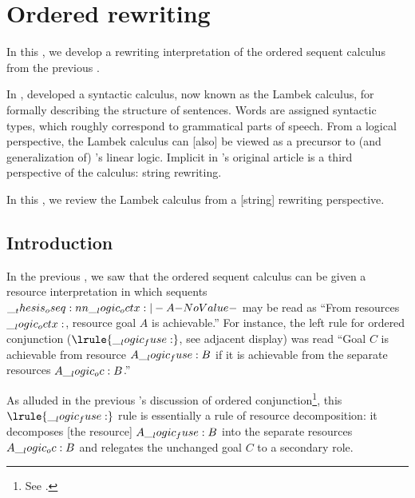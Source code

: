 \chapter{Ordered rewriting}\label{ch:ordered-rewriting}

In this , we develop a rewriting interpretation of the ordered sequent calculus from the previous .

In \citeyear{Lambek:AMM58}, \citeauthor{Lambek:AMM58} developed a syntactic calculus, now known as the Lambek calculus, for formally describing the structure of sentences.\autocite{Lambek:AMM58}
Words are assigned syntactic types, which roughly correspond to grammatical parts of speech.
From a logical perspective, the Lambek calculus can [also] be viewed as a precursor to (and generalization of) \citeauthor{Girard:TCS87}'s linear logic\autocite{Girard:TCS87}\relax.\autocites{Polakow+Pfenning:MFPS99}{Polakow+Pfenning:TLCA99}
Implicit in \citeauthor{Lambek:AMM58}'s original article is a third perspective of the calculus: string rewriting.

In this , we review the Lambek calculus from a [string] rewriting perspective.








\section{Introduction}

In the previous , we saw that the ordered sequent calculus can be given a resource interpretation in which sequents $\oseq{\octx |- A}$ may be read as \enquote{From resources $\__logic_octx:$, resource goal $A$ is achievable.}
For instance, the left rule for ordered conjunction ($\lrule{\fuse}$, see adjacent display)%
was read \enquote{Goal $C$ is achievable from resource $A \__logic_fuse: B$ if it is achievable from the separate resources $A \__logic_oc: B$.}

As alluded in the previous 's discussion of ordered conjunction\footnote{See .}, this $\lrule{\fuse}$ rule is essentially a rule of resource decomposition: it decomposes [the resource] $A \__logic_fuse: B$ into the separate resources $A \__logic_oc: B$ and relegates the unchanged goal $C$ to a secondary role.

